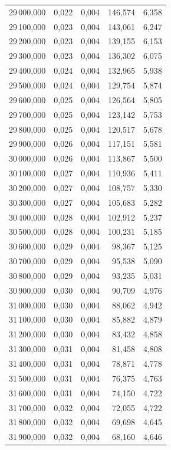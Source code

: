 \begin{longtable}{rrrrr}
29\,000,000 & 0,022 & 0,004 & 146,574 & 6,358\\
29\,100,000 & 0,023 & 0,004 & 143,061 & 6,247\\
29\,200,000 & 0,023 & 0,004 & 139,155 & 6,153\\
29\,300,000 & 0,023 & 0,004 & 136,302 & 6,075\\
29\,400,000 & 0,024 & 0,004 & 132,965 & 5,938\\
29\,500,000 & 0,024 & 0,004 & 129,754 & 5,874\\
29\,600,000 & 0,025 & 0,004 & 126,564 & 5,805\\
29\,700,000 & 0,025 & 0,004 & 123,142 & 5,753\\
29\,800,000 & 0,025 & 0,004 & 120,517 & 5,678\\
29\,900,000 & 0,026 & 0,004 & 117,151 & 5,581\\
30\,000,000 & 0,026 & 0,004 & 113,867 & 5,500\\
30\,100,000 & 0,027 & 0,004 & 110,936 & 5,411\\
30\,200,000 & 0,027 & 0,004 & 108,757 & 5,330\\
30\,300,000 & 0,027 & 0,004 & 105,683 & 5,282\\
30\,400,000 & 0,028 & 0,004 & 102,912 & 5,237\\
30\,500,000 & 0,028 & 0,004 & 100,231 & 5,185\\
30\,600,000 & 0,029 & 0,004 & 98,367 & 5,125\\
30\,700,000 & 0,029 & 0,004 & 95,538 & 5,090\\
30\,800,000 & 0,029 & 0,004 & 93,235 & 5,031\\
30\,900,000 & 0,030 & 0,004 & 90,709 & 4,976\\
31\,000,000 & 0,030 & 0,004 & 88,062 & 4,942\\
31\,100,000 & 0,030 & 0,004 & 85,882 & 4,879\\
31\,200,000 & 0,030 & 0,004 & 83,432 & 4,858\\
31\,300,000 & 0,031 & 0,004 & 81,458 & 4,808\\
31\,400,000 & 0,031 & 0,004 & 78,871 & 4,778\\
31\,500,000 & 0,031 & 0,004 & 76,375 & 4,763\\
31\,600,000 & 0,031 & 0,004 & 74,150 & 4,722\\
31\,700,000 & 0,032 & 0,004 & 72,055 & 4,722\\
31\,800,000 & 0,032 & 0,004 & 69,698 & 4,645\\
31\,900,000 & 0,032 & 0,004 & 68,160 & 4,646\\

\end{longtable}
